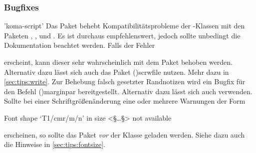 \subsubsection{Bugfixes}

\begin{DeclarePackages}
'koma-script'
  Das Paket behebt Kompatibilitätsprobleme der \KOMAScript-Klassen mit den 
  Paketen , ,  und
  . Es ist durchaus empfehlenswert, jedoch sollte unbedingt 
  die Dokumentation beachtet werden.
  Falls der Fehler 
  \vspace{-\baselineskip}
  erscheint, kann dieser sehr wahrscheinlich mit dem Paket  
  behoben werden. Alternativ dazu lässt sich auch das Paket 
  \Package(){scrwfile} nutzen. Mehr dazu in 
  \autoref{sec:tips:write}.
  Zur Behebung falsch gesetzter Randnotizen wird ein Bugfix für den Befehl 
  \Macro(){marginpar} bereitgestellt. Alternativ 
  dazu lässt sich auch  verwenden.
  Sollte bei einer Schriftgrößenänderung eine oder mehrere Warnungen der Form
  \begin{Code}
    Font shape `T1/cmr/m/n' in size <§\dots§> not available
  \end{Code}\vspace{-\baselineskip}%
  erscheinen, so sollte das Paket  \emph{vor} der Klasse 
  geladen werden. Siehe dazu auch die Hinweise in \autoref{sec:tips:fontsize}.
\end{DeclarePackages}
%
